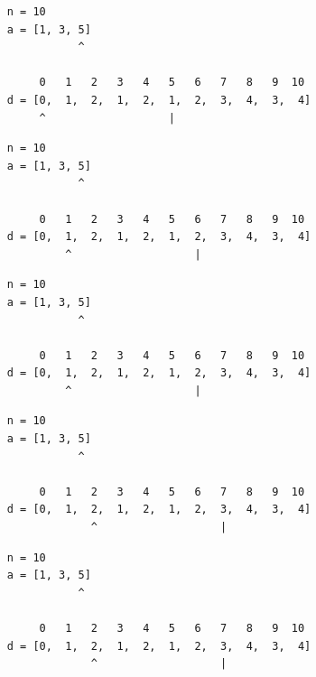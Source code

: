 \begin{frame}[fragile]
\begin{verbatim}
     n = 10
     a = [1, 3, 5]
                ^

          0   1   2   3   4   5   6   7   8   9  10
     d = [0,  1,  2,  1,  2,  1,  2,  3,  4,  3,  4]
          ^                   |
\end{verbatim}
\end{frame}
\addtocounter{framenumber}{-1}

\begin{frame}[fragile]
\begin{verbatim}
     n = 10
     a = [1, 3, 5]
                ^

          0   1   2   3   4   5   6   7   8   9  10
     d = [0,  1,  2,  1,  2,  1,  2,  3,  4,  3,  4]
              ^                   |
\end{verbatim}
\end{frame}
\addtocounter{framenumber}{-1}

\begin{frame}[fragile]
\begin{verbatim}
     n = 10
     a = [1, 3, 5]
                ^

          0   1   2   3   4   5   6   7   8   9  10
     d = [0,  1,  2,  1,  2,  1,  2,  3,  4,  3,  4]
              ^                   |
\end{verbatim}
\end{frame}
\addtocounter{framenumber}{-1}

\begin{frame}[fragile]
\begin{verbatim}
     n = 10
     a = [1, 3, 5]
                ^

          0   1   2   3   4   5   6   7   8   9  10
     d = [0,  1,  2,  1,  2,  1,  2,  3,  4,  3,  4]
                  ^                   |
\end{verbatim}
\end{frame}
\addtocounter{framenumber}{-1}

\begin{frame}[fragile]
\begin{verbatim}
     n = 10
     a = [1, 3, 5]
                ^

          0   1   2   3   4   5   6   7   8   9  10
     d = [0,  1,  2,  1,  2,  1,  2,  3,  4,  3,  4]
                  ^                   |
\end{verbatim}
\end{frame}
\addtocounter{framenumber}{-1}

